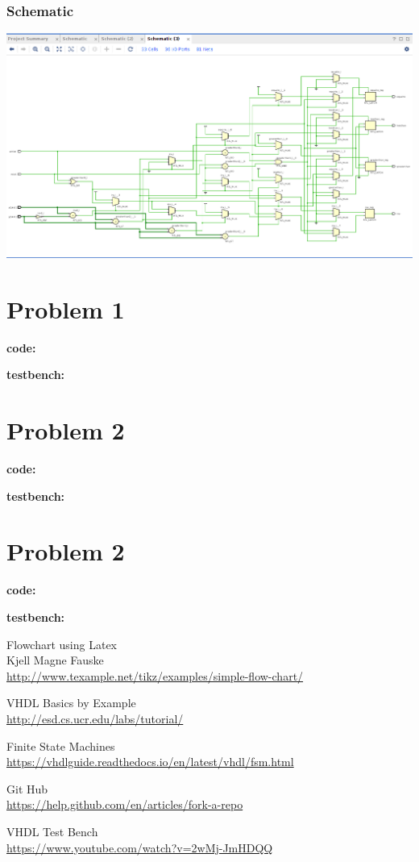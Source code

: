 \documentclass[12pt]{article}
\begin{document}
\subsubsection{Schematic}
\includegraphics[width=\linewidth]{lab10_ps3b.png}
 \appendix
   \appendixpage
   \addappheadtotoc
  \section*{Problem 1}
  {\large \textbf{code:}}
  
  {\large \textbf{testbench:}}
  
  \section*{Problem 2}
  {\large \textbf{code:}}
  
  {\large \textbf{testbench:}}
  
  \section*{Problem 2}
  {\large \textbf{code:}}
  
  {\large \textbf{testbench:}}
  
  
  
\newpage
\begin{thebibliography}{11}
Flowchart using Latex\\
Kjell Magne Fauske \\
\url{http://www.texample.net/tikz/examples/simple-flow-chart/}

VHDL Basics by Example \\
\url{http://esd.cs.ucr.edu/labs/tutorial/}

Finite State Machines\\
\url{https://vhdlguide.readthedocs.io/en/latest/vhdl/fsm.html}

Git Hub\\
\url{https://help.github.com/en/articles/fork-a-repo}

VHDL Test Bench\\
\url{https://www.youtube.com/watch?v=2wMj-JmHDQQ}

\end{thebibliography}

   
   
\end{document}
